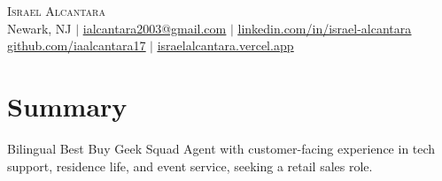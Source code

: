 \documentclass[letterpaper,11pt]{article}
\begin{document}
\begin{center}
    {\Huge \scshape Israel Alcantara} \\ \vspace{1pt}
    \small Newark, NJ $|$ \href{mailto:ialcantara2003@gmail.com}{\underline{ialcantara2003@gmail.com}} $|$
    \href{https://www.linkedin.com/in/israel-alcantara}{\underline{linkedin.com/in/israel-alcantara}} \\
    \href{https://github.com/iaalcantara17}{\underline{github.com/iaalcantara17}} $|$
    \href{https://israelalcantara.vercel.app}{\underline{israelalcantara.vercel.app}}
\end{center}
\vspace{-8pt}
\section{Summary}
\begin{itemize}[leftmargin=0.15in, label={}]
    \small{\item{Bilingual Best Buy Geek Squad Agent with customer-facing experience in tech support, residence life, and event service, seeking a retail sales role.}}
\end{itemize}
\end{document}
